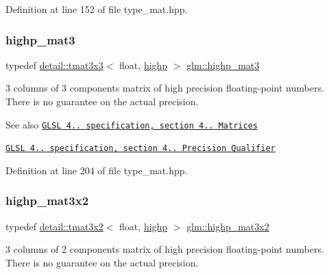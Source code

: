 Definition at line 152 of file type\+\_\+mat.\+hpp.

\mbox{\label{group__core__precision_ga334034520a655db41a2e188951f6aaad}} 
\subsubsection{\texorpdfstring{highp\+\_\+mat3}{highp\_mat3}}
{\footnotesize\ttfamily typedef \hyperlink{structglm_1_1detail_1_1tmat3x3}{detail\+::tmat3x3}$<$ float, \hyperlink{namespaceglm_a0f04f086094c747d227af4425893f545ac6f7eab42eacbb10d59a58e95e362074}{highp} $>$ \hyperlink{group__core__precision_ga334034520a655db41a2e188951f6aaad}{glm\+::highp\+\_\+mat3}}

3 columns of 3 components matrix of high precision floating-\/point numbers. There is no guarantee on the actual precision.

\begin{DoxySeeAlso}{See also}
\href{http://www.opengl.org/registry/doc/GLSLangSpec.4.20.8.pdf}{\tt G\+L\+SL 4.. specification, section 4.. Matrices} 

\href{http://www.opengl.org/registry/doc/GLSLangSpec.4.20.8.pdf}{\tt G\+L\+SL 4.. specification, section 4.. Precision Qualifier} 
\end{DoxySeeAlso}


Definition at line 204 of file type\+\_\+mat.\+hpp.

\mbox{\label{group__core__precision_gabc7767293ff69cd56717ee9d8be62963}} 
\subsubsection{\texorpdfstring{highp\+\_\+mat3x2}{highp\_mat3x2}}
{\footnotesize\ttfamily typedef \hyperlink{structglm_1_1detail_1_1tmat3x2}{detail\+::tmat3x2}$<$ float, \hyperlink{namespaceglm_a0f04f086094c747d227af4425893f545ac6f7eab42eacbb10d59a58e95e362074}{highp} $>$ \hyperlink{group__core__precision_gabc7767293ff69cd56717ee9d8be62963}{glm\+::highp\+\_\+mat3x2}}

3 columns of 2 components matrix of high precision floating-\/point numbers. There is no guarantee on the actual precision.

